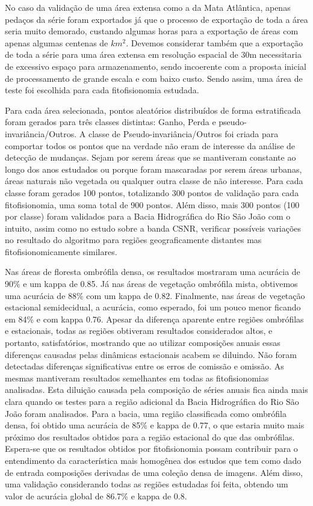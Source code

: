 No caso da validação de uma área extensa como a da Mata Atlântica, apenas pedaços da série foram exportados já que o processo de exportação de toda a área seria muito demorado, custando algumas horas para a exportação de áreas com apenas algumas centenas de $ km^2 $. Devemos considerar também que a exportação de toda a série para uma área extensa em resolução espacial de 30m necessitaria de excessivo espaço para armazenamento, sendo incoerente com a proposta inicial de processamento de grande escala e com baixo custo. 
Sendo assim, uma área de teste foi escolhida para cada fitofisionomia estudada.

Para cada área selecionada, pontos aleatórios distribuídos de forma estratificada foram gerados para três classes distintas: Ganho, Perda e  pseudo-invariância/Outros. A classe de Pseudo-invariância/Outros foi criada para comportar todos os pontos que na verdade não eram de interesse da análise de detecção de mudanças. Sejam por serem áreas que se mantiveram constante ao longo dos anos estudados ou porque foram mascaradas por serem áreas urbanas, áreas naturais não vegetada ou qualquer outra classe de não interesse. Para cada classe foram gerados 100 pontos, totalizando 300 pontos de validação para cada fitofisionomia, uma soma total de 900 pontos. Além disso, mais 300 pontos (100 por classe) foram validados para a Bacia Hidrográfica do Rio São João com o intuito, assim como no estudo sobre a banda CSNR, verificar possíveis variações no resultado do algoritmo para regiões geograficamente distantes mas fitofisionomicamente similares.

Nas áreas de floresta ombrófila densa, os resultados mostraram uma acurácia de 90\% e um kappa de 0.85. Já nas áreas de vegetação ombrófila mista, obtivemos uma acurácia de 88\% com um kappa de 0.82. Finalmente, nas áreas de vegetação estacional semidecidual, a acurácia, como esperado, foi um pouco menor ficando em 84\% e com kappa 0.76. Apesar da diferença aparente entre regiões ombrófilas e estacionais, todas as regiões obtiveram resultados considerados altos, e portanto, satisfatórios, mostrando que ao utilizar composições anuais essas diferenças causadas pelas dinâmicas estacionais acabem se diluindo. Não foram detectadas diferenças significativas entre os erros de comissão e omissão. As mesmas mantiveram resultados semelhantes em todas as fitofisionomias analisadas.  
Esta diluição causada pela composição de séries anuais fica ainda mais clara quando os testes para a região adicional da Bacia Hidrográfica do Rio São João foram analisados. Para a bacia, uma região classificada como ombrófila densa, foi obtido uma acurácia de 85\% e kappa de 0.77, o que estaria muito mais próximo dos resultados obtidos para a região estacional do que das ombrófilas. Espera-se que os resultados obtidos por fitofisionomia possam contribuir para o entendimento da característica mais homogênea dos estudos que tem como dado de entrada composições derivadas de uma coleção densa de imagens. Além disso, uma validação considerando todas as regiões estudadas foi feita, obtendo um valor de acurácia global de 86.7\% e kappa de 0.8. 

